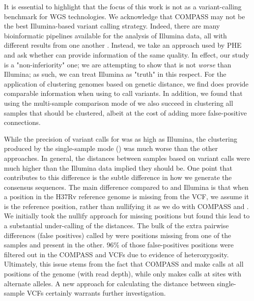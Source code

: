It is essential to highlight that the focus of this work is not as a variant-calling benchmark for WGS technologies. We acknowledge that COMPASS may not be the best Illumina-based variant calling strategy. Indeed, there are many bioinformatic pipelines available for the analysis of \mtb{} Illumina data, all with different results from one another \cite{walter2020}. Instead, we take an approach used by PHE and ask whether \ont{} can provide information of the same quality. In effect, our study is a "non-inferiority" one; we are attempting to show that \ont{} is not \emph{worse} than Illumina; as such, we can treat Illumina as "truth" in this respect. For the application of clustering \mtb{} genomes based on genetic distance, we find \ont{} does provide comparable information when using \bcftools{} to call variants. In addition, we found that using the multi-sample comparison mode of \pandora{} we also succeed in clustering all samples that should be clustered, albeit at the cost of adding more false-positive connections. 

While the precision of variant calls for \pandora{} was as high as Illumina, the clustering produced by the single-sample mode () was much worse than the other approaches. In general, the distances between samples based on \pandora{}  variant calls were much higher than the Illumina data implied they should be. One point that contributes to this difference is the subtle difference in how we generate the \pandora{}  consensus sequences. The main difference compared to \bcftools{} and Illumina is that when a position in the H37Rv reference genome is missing from the \pandora{}  VCF, we assume it is the reference position, rather than nullifying it as we do with COMPASS and \bcftools{}. We initially took the nullify approach for missing positions but found this lead to a substantial under-calling of the distances. The bulk of the extra pairwise differences (false positives) called by \pandora{}  were positions missing from one of the samples and present in the other. 96\% of those false-positives positions were filtered out in the COMPASS and \bcftools{} VCFs due to evidence of heterozygosity. Ultimately, this issue stems from the fact that COMPASS and \bcftools{} make calls at all positions of the genome (with read depth), while \pandora{} only makes calls at sites with alternate alleles. A new approach for calculating the distance between \pandora{} single-sample VCFs certainly warrants further investigation.

